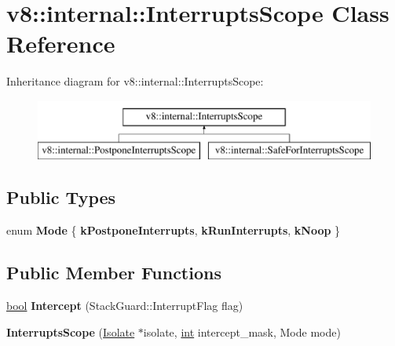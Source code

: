 \hypertarget{classv8_1_1internal_1_1InterruptsScope}{}\section{v8\+:\+:internal\+:\+:Interrupts\+Scope Class Reference}
\label{classv8_1_1internal_1_1InterruptsScope}
Inheritance diagram for v8\+:\+:internal\+:\+:Interrupts\+Scope\+:\begin{figure}[H]
\begin{center}
\leavevmode
\includegraphics[height=2.000000cm]{classv8_1_1internal_1_1InterruptsScope}
\end{center}
\end{figure}
\subsection*{Public Types}
\begin{DoxyCompactItemize}
\item 
\mbox{\label{classv8_1_1internal_1_1InterruptsScope_a359e286201c57e88caf03a22a4fe7aff}} 
enum {\bfseries Mode} \{ {\bfseries k\+Postpone\+Interrupts}, 
{\bfseries k\+Run\+Interrupts}, 
{\bfseries k\+Noop}
 \}
\end{DoxyCompactItemize}
\subsection*{Public Member Functions}
\begin{DoxyCompactItemize}
\item 
\mbox{\label{classv8_1_1internal_1_1InterruptsScope_a8d8966e152e7ab5ab3d995022ba611be}} 
\mbox{\hyperlink{classbool}{bool}} {\bfseries Intercept} (Stack\+Guard\+::\+Interrupt\+Flag flag)
\item 
\mbox{\label{classv8_1_1internal_1_1InterruptsScope_a294754c2ac87200510c5c267fc1102e7}} 
{\bfseries Interrupts\+Scope} (\mbox{\hyperlink{classv8_1_1internal_1_1Isolate}{Isolate}} $\ast$isolate, \mbox{\hyperlink{classint}{int}} intercept\+\_\+mask, Mode mode)
\end{DoxyCompactItemize}
